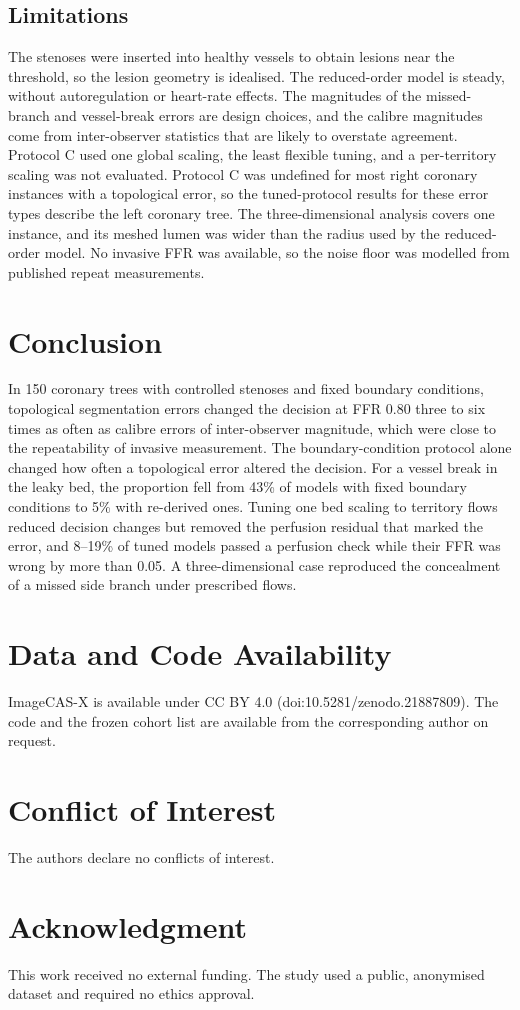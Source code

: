 \documentclass[journal]{IEEEtran}
\begin{document}
\subsection{Limitations}
The stenoses were inserted into healthy vessels to obtain lesions near the threshold, so the lesion geometry is
idealised. The reduced-order model is steady, without autoregulation or heart-rate effects. The magnitudes of the
missed-branch and vessel-break errors are design choices, and the calibre magnitudes come from inter-observer
statistics that are likely to overstate agreement. Protocol C used one global scaling, the least flexible tuning, and
a per-territory scaling was not evaluated. Protocol C was undefined for most right coronary instances with a
topological error, so the tuned-protocol results for these error types describe the left coronary tree. The
three-dimensional analysis covers one instance, and its meshed lumen was wider than the radius used by the
reduced-order model. No invasive FFR was available, so the noise floor was modelled from published repeat
measurements.

\section{Conclusion}
In 150 coronary trees with controlled stenoses and fixed boundary conditions, topological segmentation errors
changed the decision at FFR 0.80 three to six times as often as calibre errors of inter-observer magnitude, which
were close to the repeatability of invasive measurement. The boundary-condition protocol alone changed how often a topological error altered the decision. For a vessel break in the leaky bed, the proportion fell from 43\% of models with fixed boundary conditions to 5\% with re-derived ones. Tuning one bed scaling to territory flows reduced decision changes
but removed the perfusion residual that marked the error, and 8--19\% of tuned models passed a perfusion check while
their FFR was wrong by more than 0.05. A three-dimensional case reproduced the concealment of a missed side branch
under prescribed flows.

\section*{Data and Code Availability}
ImageCAS-X is available under CC BY 4.0 (doi:10.5281/zenodo.21887809). The code and the frozen cohort list are
available from the corresponding author on request.

\section*{Conflict of Interest}
The authors declare no conflicts of interest.

\section*{Acknowledgment}
This work received no external funding. The study used a public, anonymised dataset and required no ethics
approval.



\end{document}
